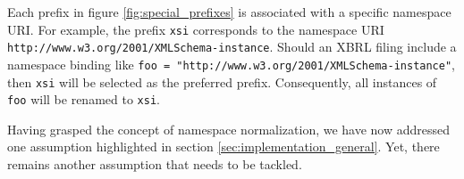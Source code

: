 Each prefix in figure \ref{fig:special_prefixes} is associated with a specific namespace URI.
For example, the prefix \texttt{xsi} corresponds to the namespace URI \texttt{http://www.w3.org/2001/XMLSchema-instance}.
Should an XBRL filing include a namespace binding like \texttt{foo = "http://www.w3.org/2001/XMLSchema-instance"},
then \texttt{xsi} will be selected as the preferred prefix. Consequently, all instances of \texttt{foo} will be renamed to \texttt{xsi}.



Having grasped the concept of namespace normalization, we have now addressed one assumption highlighted in section \ref{sec:implementation_general}.
Yet, there remains another assumption that needs to be tackled.
